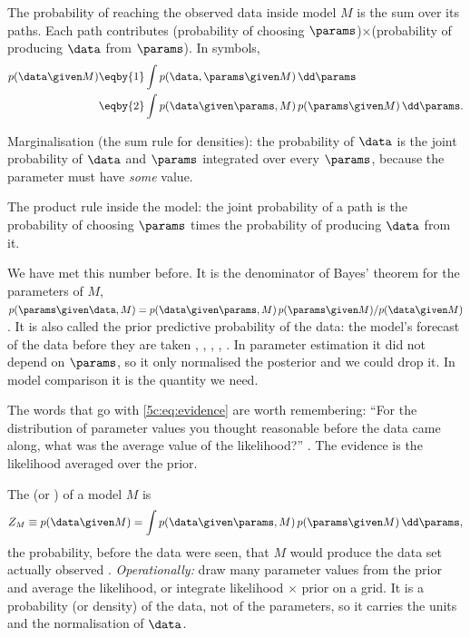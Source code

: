 The probability of reaching the observed data inside model $M$ is the sum over its
paths. Each path contributes (probability of choosing $\params$)$\times$(probability
of producing $\data$ from $\params$). In symbols,
\begin{align}
  p(\data\given M)
  &\eqby{1}\int p(\data,\params\given M)\,\dd\params \nonumber\\
  &\eqby{2}\int p(\data\given\params,M)\,p(\params\given M)\,\dd\params .
  \label{5c:eq:evidence}
\end{align}
\begin{explain}
  \item Marginalisation (the sum rule for densities): the probability of $\data$ is
        the joint probability of $\data$ and $\params$ integrated over every
        $\params$, because the parameter must have \emph{some} value.
  \item The product rule inside the model: the joint probability of a path is the
        probability of choosing $\params$ times the probability of producing $\data$
        from it.
\end{explain}
We have met this number before. It is the denominator of Bayes' theorem for the
parameters of $M$,
$p(\params\given\data,M)=p(\data\given\params,M)\,p(\params\given M)/p(\data\given M)$.
It is also called the prior predictive probability of the data: the model's forecast
of the data before they are taken ,
, ,
, \cite[eq.~(17)]{Trotta2008}. In parameter estimation it did
not depend on $\params$, so it only normalised the posterior and we could drop it.
In model comparison it is the quantity we need.

The words that go with \eqref{5c:eq:evidence} are worth remembering: ``For the
distribution of parameter values you thought reasonable before the data came along,
what was the average value of the likelihood?'' . The
evidence is the likelihood averaged over the prior.

\begin{workdef}
The  (or ) of a model $M$ is
\[
  Z_M\equiv p(\data\given M)=\int p(\data\given\params,M)\,p(\params\given M)\,\dd\params ,
\]
the probability, before the data were seen, that $M$ would produce the data set
actually observed .
\emph{Operationally:} draw many parameter values from the prior and average the
likelihood, or integrate likelihood $\times$ prior on a grid. It is a probability
(or density) of the data, not of the parameters, so it carries the units and the
normalisation of $\data$.
\end{workdef}

